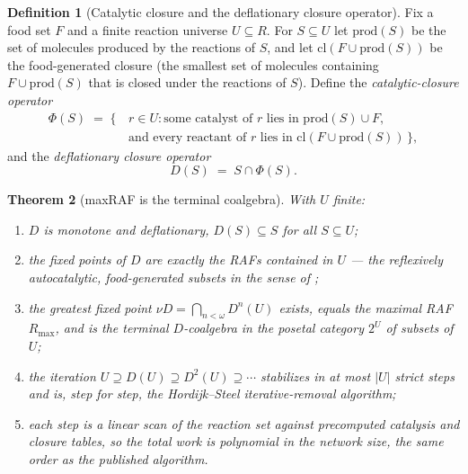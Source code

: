 \documentclass[11pt,a4paper]{article}
\theoremstyle{plain}
\newtheorem{theorem}{Theorem}[section]
\theoremstyle{definition}
\newtheorem{definition}[theorem]{Definition}
\theoremstyle{remark}
\begin{document}
\begin{definition}[Catalytic closure and the deflationary closure
operator]\label{def:deflationary}
Fix a food set $F$ and a finite reaction universe $U\subseteq R$.
For $S\subseteq U$ let $\mathrm{prod}(S)$ be the set of molecules
produced by the reactions of $S$, and let
$\mathrm{cl}(F\cup\mathrm{prod}(S))$ be the food-generated closure
(the smallest set of molecules containing $F\cup
\mathrm{prod}(S)$ that is closed under the reactions of $S$).
Define the \emph{catalytic-closure operator}
\begin{equation}\label{eq:Phi-def}
\begin{split}
  \Phi(S) \;=\; \{\, & r\in U : \text{some catalyst of } r \text{ lies in }
  \mathrm{prod}(S)\cup F,\\
  & \text{and every reactant of } r \text{ lies in }
  \mathrm{cl}(F\cup\mathrm{prod}(S)) \,\},
\end{split}
\end{equation}
and the \emph{deflationary closure operator}
\begin{equation}\label{eq:D-def}
  D(S) \;=\; S \cap \Phi(S).
\end{equation}
\end{definition}

\begin{theorem}[maxRAF is the terminal coalgebra]
\label{thm:maxraf-terminal}
With $U$ finite:
\begin{enumerate}[leftmargin=*,itemsep=2pt]
\item[(i)] $D$ is monotone and deflationary, $D(S)\subseteq S$
  for all $S\subseteq U$;
\item[(ii)] the fixed points of $D$ are exactly the RAFs
  contained in $U$ --- the reflexively autocatalytic,
  food-generated subsets in the sense of
  \citealp{hordijk2011,steel2004};
\item[(iii)] the greatest fixed point
  $\nu D=\bigcap_{n<\omega}D^{n}(U)$ exists, equals the maximal
  RAF $R_{\max}$, and is the terminal $D$-coalgebra in the posetal
  category $2^{U}$ of subsets of $U$;
\item[(iv)] the iteration $U\supseteq D(U)\supseteq D^{2}(U)
  \supseteq\cdots$ stabilizes in at most $|U|$ strict steps and
  is, step for step, the Hordijk--Steel iterative-removal
  algorithm;
\item[(v)] each step is a linear scan of the reaction set against
  precomputed catalysis and closure tables, so the total work is
  polynomial in the network size, the same order as the published
  algorithm.
\end{enumerate}
\end{theorem}
\end{document}
